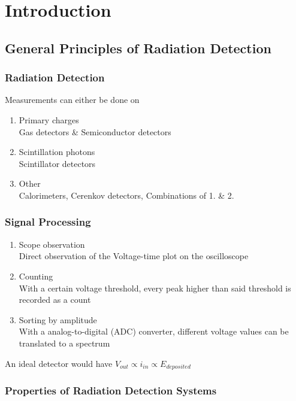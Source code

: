 \section{Introduction}

\subsection{General Principles of Radiation Detection}

\subsubsection{Radiation Detection}

Measurements can either be done on
\begin{enumerate}
    \item Primary charges\\
    Gas detectors \& Semiconductor detectors
    \item Scintillation photons\\
    Scintillator detectors 
    \item Other\\
    Calorimeters, Cerenkov detectors, Combinations of 1. \& 2.
\end{enumerate}

\subsubsection{Signal Processing}
\begin{enumerate}
    \item Scope observation\\
    Direct observation of the Voltage-time plot on the oscilloscope 
    \item Counting\\
    With a certain voltage threshold, every peak higher than said threshold is recorded as a count
    \item Sorting by amplitude\\
    With a analog-to-digital (ADC) converter, different voltage values can be translated to a spectrum
\end{enumerate}
An ideal detector would have $V_{out}\propto i_{in}\propto E_{deposited}$

\subsubsection{Properties of Radiation Detection Systems}

